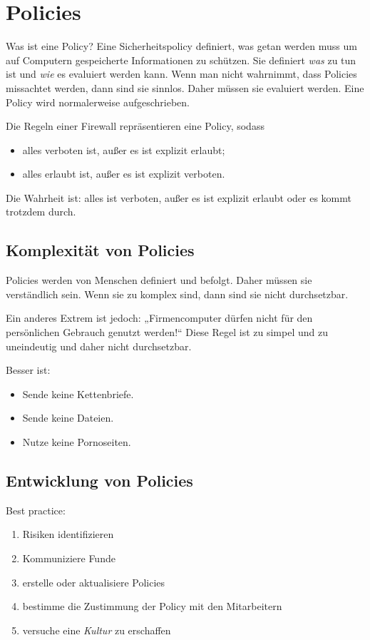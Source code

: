 \section{Policies}%
\label{sec:policies}

Was ist eine Policy?
Eine Sicherheitspolicy definiert, was getan werden muss um auf Computern gespeicherte
Informationen zu schützen.
Sie definiert \emph{was} zu tun ist und \emph{wie} es evaluiert werden kann.
Wenn man nicht wahrnimmt, dass Policies missachtet werden, dann sind sie sinnlos.
Daher müssen sie evaluiert werden.
Eine Policy wird normalerweise aufgeschrieben.

Die Regeln einer Firewall repräsentieren eine Policy, sodass
\begin{itemize}
  \item alles verboten ist, außer es ist explizit erlaubt;
  \item alles erlaubt ist, außer es ist explizit verboten.
\end{itemize}
Die Wahrheit ist: alles ist verboten,
außer es ist explizit erlaubt oder es kommt trotzdem durch.

\subsection{Komplexität von Policies}%
\label{sub:komplexitat_von_policies}

Policies werden von Menschen definiert und befolgt.
Daher müssen sie verständlich sein.
Wenn sie zu komplex sind, dann sind sie nicht durchsetzbar.

Ein anderes Extrem ist jedoch: „Firmencomputer dürfen nicht für den persönlichen Gebrauch
genutzt werden!“
Diese Regel ist zu simpel und zu uneindeutig und daher nicht durchsetzbar.

Besser ist:
\begin{itemize}
  \item Sende keine Kettenbriefe.
  \item Sende keine Dateien.
  \item Nutze keine Pornoseiten.
\end{itemize}

\subsection{Entwicklung von Policies}%
\label{sub:entwicklung_von_policies}

Best practice:
\begin{enumerate}
  \item Risiken identifizieren
  \item Kommuniziere Funde
  \item erstelle oder aktualisiere Policies
  \item bestimme die Zustimmung der Policy mit den Mitarbeitern
  \item versuche eine \emph{Kultur} zu erschaffen
\end{enumerate}

